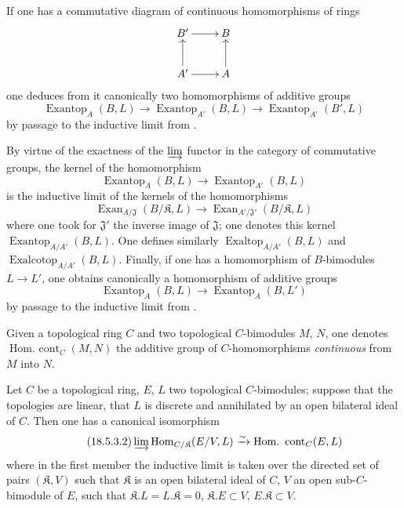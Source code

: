 \begin{env}[18.5.2]
\label{0.18.5.2}
If one has a commutative diagram of continuous homomorphisms of rings
\[
  \xymatrix{
    B'\ar[r] & B\\
    A'\ar[u]\ar[r] & A\ar[u]
  }
\]
one deduces from it canonically two homomorphisms of additive groups
\[
  \operatorname{Exantop}_A(B,L)\to\operatorname{Exantop}_{A'}(B,L)\to\operatorname{Exantop}_{A'}(B',L)
\]
by passage to the inductive limit from .

By virtue of the exactness of the $\varinjlim$ functor in the category of commutative groups, the kernel of the homomorphism
\[
  \operatorname{Exantop}_A(B,L)\to\operatorname{Exantop}_{A'}(B,L)
\]
is the inductive limit of the kernels of the homomorphisms
\[
  \operatorname{Exan}_{A/\mathfrak{J}}(B/\mathfrak K,L)\to\operatorname{Exan}_{A'/\mathfrak{J}'}(B/\mathfrak K,L)
\]
where one took for $\mathfrak{J}'$ the inverse image of $\mathfrak{J}$; one denotes this kernel $\operatorname{Exantop}_{A/A'}(B,L)$.
One defines similarly $\operatorname{Exaltop}_{A/A'}(B,L)$ and $\operatorname{Exalcotop}_{A/A'}(B,L)$.
Finally, if one has a homomorphism
of $B$-bimodules $L\to L'$, one obtains canonically a homomorphism of additive groups
\[
  \operatorname{Exantop}_A(B,L)\to\operatorname{Exantop}_A(B,L')
\]
by passage to the inductive limit from .
\end{env}

\begin{env}[18.5.3]
\label{0.18.5.3}
Given a topological ring $C$ and two topological $C$-bimodules $M$, $N$, one denotes $\operatorname{Hom.\ cont}_C(M,N)$ the additive group of $C$-homomorphisms \emph{continuous} from $M$ into $N$.
\end{env}

\begin{lemma}[18.5.3.1]
\label{0.18.5.3.1}
Let $C$ be a topological ring, $E$, $L$ two topological $C$-bimodules; suppose that the topologies are linear, that $L$ is discrete and annihilated by an open bilateral ideal of $C$.
Then one has a canonical isomorphism
\begin{equation}
\tag{18.5.3.2}
  \label{0.18.5.3.2}
  \varinjlim\operatorname{Hom}_{C/\mathfrak K}(E/V,L)\xrightarrow{\sim}\operatorname{Hom.\ cont}_C(E,L)
\end{equation}
where in the first member the inductive limit is taken over the directed set of pairs $(\mathfrak K,V)$ such that $\mathfrak K$ is an open bilateral ideal of $C$, $V$ an open sub-$C$-bimodule of $E$, such that $\mathfrak K.L=L.\mathfrak K=0$, $\mathfrak K.E\subset V$, $E.\mathfrak K\subset V$.
\end{lemma}

